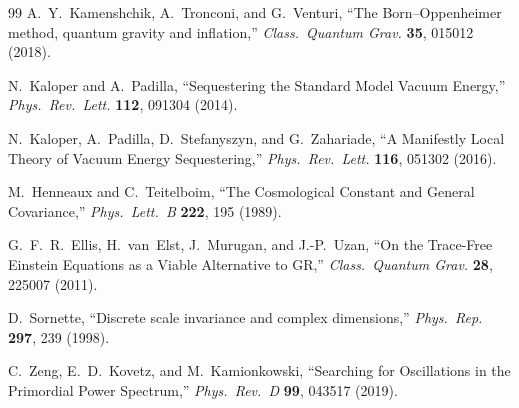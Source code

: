 \documentclass[twocolumn,aps,prd,showpacs,nofootinbib,superscriptaddress]{revtex4-2}
\begin{document}
\begin{thebibliography}{99}
A.~Y.~Kamenshchik, A.~Tronconi, and G.~Venturi,
``The Born--Oppenheimer method, quantum gravity and inflation,''
\emph{Class.\ Quantum Grav.} \textbf{35}, 015012 (2018).

N.~Kaloper and A.~Padilla,
``Sequestering the Standard Model Vacuum Energy,''
\emph{Phys.\ Rev.\ Lett.} \textbf{112}, 091304 (2014).

N.~Kaloper, A.~Padilla, D.~Stefanyszyn, and G.~Zahariade,
``A Manifestly Local Theory of Vacuum Energy Sequestering,''
\emph{Phys.\ Rev.\ Lett.} \textbf{116}, 051302 (2016).

M.~Henneaux and C.~Teitelboim,
``The Cosmological Constant and General Covariance,''
\emph{Phys.\ Lett.\ B} \textbf{222}, 195 (1989).

G.~F.~R.~Ellis, H.~van~Elst, J.~Murugan, and J.-P.~Uzan,
``On the Trace-Free Einstein Equations as a Viable Alternative to GR,''
\emph{Class.\ Quantum Grav.} \textbf{28}, 225007 (2011).

D.~Sornette,
``Discrete scale invariance and complex dimensions,''
\emph{Phys.\ Rep.} \textbf{297}, 239 (1998).

C.~Zeng, E.~D.~Kovetz, and M.~Kamionkowski,
``Searching for Oscillations in the Primordial Power Spectrum,''
\emph{Phys.\ Rev.\ D} \textbf{99}, 043517 (2019).

\end{thebibliography}
\end{document}

